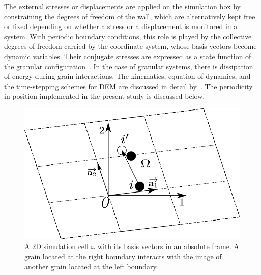 The external stresses or displacements are applied on the simulation box by 
constraining the degrees of freedom of the wall, which are alternatively kept 
free or fixed depending on whether a stress or a displacement is monitored in a 
system. With periodic boundary conditions, this role is played by the 
collective degrees of freedom carried by the coordinate system, whose basis 
vectors become dynamic variables. Their conjugate stresses are expressed as 
a state function of the granular configuration~\citep{Parrinello1980}. In the 
case of granular systems, there is dissipation of energy during grain 
interactions. The kinematics, equation of dynamics, and the time-stepping 
schemes for DEM are discussed in detail by~\citet{Voiv2011}. The periodicity in 
position implemented in the present study is discussed below. 
%
\begin{figure}[htbp]
\centering
\includegraphics[scale=0.65]{periodic}
\caption[A 2D periodic simulation cell $\omega$ with its basis vectors in an 
absolute frame.]{A 2D simulation cell $\omega$ with its basis vectors in an 
absolute 
frame. A grain located at the right boundary interacts with the image of 
another grain located at the left boundary.}
\label{fig:periodic}
\end{figure}

